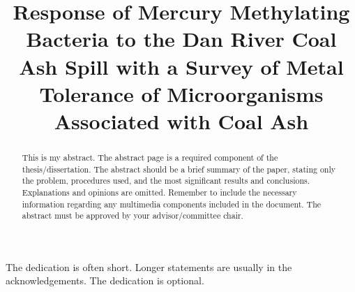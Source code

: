 \documentclass[ms]{uncgdissertationexp}
\title{Response of Mercury Methylating Bacteria to the Dan River Coal Ash Spill
with a Survey of Metal Tolerance of Microorganisms Associated with Coal
Ash}
\theoremstyle{plain}
\theoremstyle{definition}
\theoremstyle{remark}
\begin{document}
\frontmatter      %

\begin{abstract}
  This is my abstract. The abstract page is a required component of the
  thesis/dissertation. The abstract should be a brief summary of the
  paper, stating only the problem, procedures used, and the most
  significant results and conclusions. Explanations and opinions are
  omitted. Remember to include the necessary information regarding any
  multimedia components included in the document. The abstract must be
  approved by your advisor/committee chair.
\end{abstract}
\maketitlepage


\begin{dedication}
  The dedication is often short. Longer statements are usually in the
  acknowledgements. The dedication is optional.
\end{dedication}
\makeapprovalpage
\end{document}
